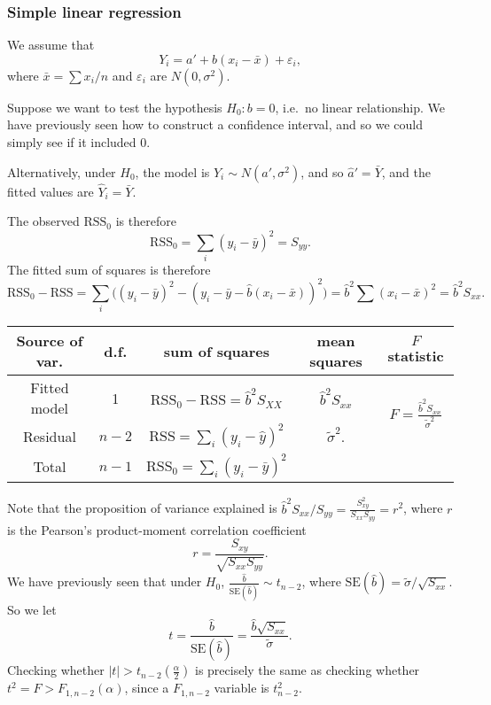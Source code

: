 \documentclass[a4paper]{article}
\begin{document}
\subsubsection{Simple linear regression}
We assume that
\[
  Y_i = a' + b(x_i - \bar x) + \varepsilon_i,
\]
where $\bar x = \sum x_i/n$ and $\varepsilon_i$ are $N(0, \sigma^2)$.

Suppose we want to test the hypothesis $H_0: b = 0$, i.e.\ no linear relationship. We have previously seen how to construct a confidence interval, and so we could simply see if it included 0.

Alternatively, under $H_0$, the model is $Y_i \sim N(a', \sigma^2)$, and so $\hat a' = \bar Y$, and the fitted values are $\hat Y_i = \bar Y$.

The observed $\mathrm{RSS}_0$ is therefore
\[
  \mathrm{RSS}_0 = \sum_i (y_i - \bar y)^2 = S_{yy}.
\]
The fitted sum of squares is therefore
\[
  \mathrm{RSS}_0 - \mathrm{RSS} = \sum_i \big((y_i - \bar y)^2 - (y_i - \bar y - \hat{b}(x_i - \bar x))^2\big) = \hat{b}^2 \sum (x_i - \bar x)^2 = \hat{b}^2 S_{xx}.
\]
\begin{center}
  \begin{tabular}{ccccc}
    \toprule
    Source of var. & d.f. & sum of squares & mean squares & $F$ statistic\\
    \midrule
    Fitted model & 1 & $\mathrm{RSS}_0 - \mathrm{RSS} = \hat{b}^2 S_{XX}$ & $\hat{b}^2 S_{xx}$ & \multirow{2}{*}{$F = \frac{\hat{b}^2 S_{xx}}{\tilde{\sigma}^2}$}\\
    Residual & $n - 2$ & $\mathrm{RSS} = \sum_i (y_i- \hat y)^2$ & $\tilde{\sigma}^2$.\\
    \midrule
    Total & $n - 1$ & $\mathrm{RSS}_0 = \sum_i (y_i - \bar y)^2$\\
    \bottomrule
  \end{tabular}
\end{center}
Note that the proposition of variance explained is $\hat{b}^2S_{xx}/S_{yy} = \frac{S_{xy}^2}{S_{xx}S_{yy}} = r^2$, where $r$ is the Pearson's product-moment correlation coefficient
\[
  r = \frac{S_{xy}}{\sqrt{S_{xx}S_{yy}}}.
\]
We have previously seen that under $H_0$, $\frac{\hat{b}}{\mathrm{SE}(\hat{b})} \sim t_{n - 2}$, where $\mathrm{SE}(\hat{b}) = \tilde{\sigma}/\sqrt{S_{xx}}$. So we let
\[
  t = \frac{\hat{b}}{\mathrm{SE}(\hat{b})} = \frac{\hat{b}\sqrt{S_{xx}}}{\tilde{\sigma}}.
\]
Checking whether $|t| > t_{n - 2}\left(\frac{\alpha}{2}\right)$ is precisely the same as checking whether $t^2 = F > F_{1, n - 2}(\alpha)$, since a $F_{1, n - 2}$ variable is $t_{n - 2}^2$.
\end{document}
